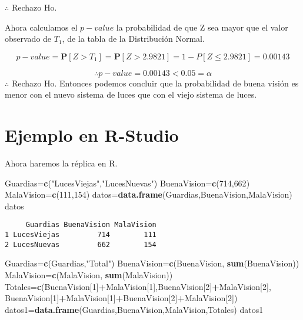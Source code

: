\documentclass[a4paper,oneside,openany]{book}
\newenvironment{Shaded}{\begin{snugshade}}{\end{snugshade}}
\newcommand{\KeywordTok}[1]{\textcolor[rgb]{0.13,0.29,0.53}{\textbf{#1}}}
\newcommand{\DecValTok}[1]{\textcolor[rgb]{0.00,0.00,0.81}{#1}}
\newcommand{\StringTok}[1]{\textcolor[rgb]{0.31,0.60,0.02}{#1}}
\newcommand{\OperatorTok}[1]{\textcolor[rgb]{0.81,0.36,0.00}{\textbf{#1}}}
\newcommand{\NormalTok}[1]{#1}
\begin{document}
\(\therefore\) Rechazo Ho.

Ahora calculamos el \(p-value\) la probabilidad de que Z sea mayor que
el valor observado de \(T_{1}\), de la tabla de la Distribución Normal.

\[p-value=\mathbf{P}[Z>T_{1}]=\mathbf{P}[Z>2.9821]=1-P[Z\leq2.9821]=0.00143\]

\[\therefore p-value=0.00143 < 0.05=\alpha\] \(\therefore\) Rechazo Ho.
Entonces podemos concluir que la probabilidad de buena visión es menor
con el nuevo sistema de luces que con el viejo sistema de luces.

\section{Ejemplo en R-Studio}\label{ejemplo-en-r-studio-9}

Ahora haremos la réplica en R.

\begin{Shaded}
\begin{Highlighting}[]
\NormalTok{Guardias=}\KeywordTok{c}\NormalTok{(}\StringTok{"LucesViejas"}\NormalTok{,}\StringTok{"LucesNuevas"}\NormalTok{)}
\NormalTok{BuenaVision=}\KeywordTok{c}\NormalTok{(}\DecValTok{714}\NormalTok{,}\DecValTok{662}\NormalTok{)}
\NormalTok{MalaVision=}\KeywordTok{c}\NormalTok{(}\DecValTok{111}\NormalTok{,}\DecValTok{154}\NormalTok{)}
\NormalTok{datos=}\KeywordTok{data.frame}\NormalTok{(Guardias,BuenaVision,MalaVision)}
\NormalTok{datos}
\end{Highlighting}
\end{Shaded}

\begin{verbatim}
     Guardias BuenaVision MalaVision
1 LucesViejas         714        111
2 LucesNuevas         662        154
\end{verbatim}

\begin{Shaded}
\begin{Highlighting}[]
\NormalTok{Guardias=}\KeywordTok{c}\NormalTok{(Guardias,}\StringTok{"Total"}\NormalTok{)}
\NormalTok{BuenaVision=}\KeywordTok{c}\NormalTok{(BuenaVision, }\KeywordTok{sum}\NormalTok{(BuenaVision))}
\NormalTok{MalaVision=}\KeywordTok{c}\NormalTok{(MalaVision, }\KeywordTok{sum}\NormalTok{(MalaVision))}
\NormalTok{Totales=}\KeywordTok{c}\NormalTok{(BuenaVision[}\DecValTok{1}\NormalTok{]}\OperatorTok{+}\NormalTok{MalaVision[}\DecValTok{1}\NormalTok{],BuenaVision[}\DecValTok{2}\NormalTok{]}\OperatorTok{+}\NormalTok{MalaVision[}\DecValTok{2}\NormalTok{],}
\NormalTok{           BuenaVision[}\DecValTok{1}\NormalTok{]}\OperatorTok{+}\NormalTok{MalaVision[}\DecValTok{1}\NormalTok{]}\OperatorTok{+}\NormalTok{BuenaVision[}\DecValTok{2}\NormalTok{]}\OperatorTok{+}\NormalTok{MalaVision[}\DecValTok{2}\NormalTok{])}
\NormalTok{datos1=}\KeywordTok{data.frame}\NormalTok{(Guardias,BuenaVision,MalaVision,Totales)}
\NormalTok{datos1}
\end{Highlighting}
\end{Shaded}
\end{document}
